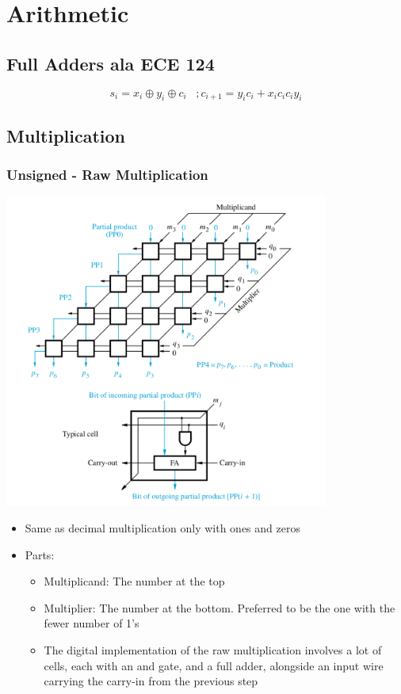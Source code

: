 \documentclass[10pt]{article}
\begin{document}
\section*{Arithmetic}
\subsection{Full Adders ala ECE 124}
$$s_i = {x_i\oplus y_i\oplus c_i}\;\;\;; c_{i+1} = y_ic_i + x_ic_i c_iy_i$$
\subsection{Multiplication}
\subsubsection{Unsigned - Raw Multiplication}
\includegraphics[width=0.8\textwidth]{arithmetic/array_multiplier.png}
\begin{itemize}
    \item Same as decimal multiplication only with ones and zeros
    \item Parts:
    \begin{itemize}
        \item Multiplicand: The number at the top
        \item Multiplier: The number at the bottom. Preferred to be the one with the fewer number of 1's
    \item The digital implementation of the raw multiplication involves a lot of cells, each with an and gate, and a full adder, alongside an input wire carrying the carry-in from the previous step
    \end{itemize}
\end{itemize}
\end{document}
